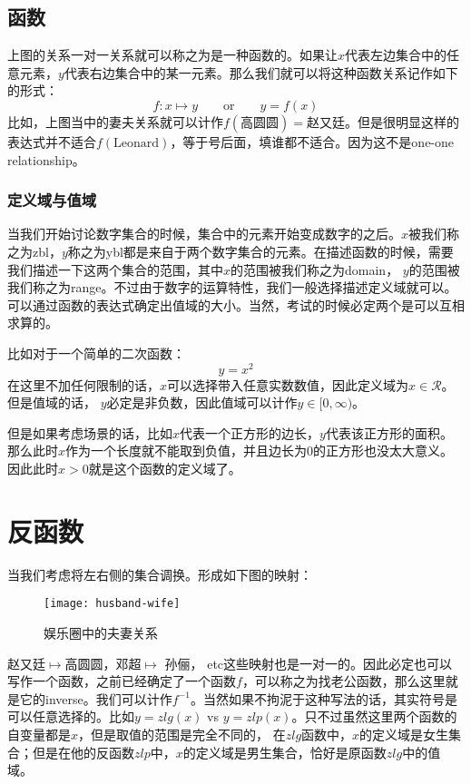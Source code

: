 \subsection*{函数}
\label{subsec:Function}
上图的关系一对一关系就可以称之为是一种函数的。如果让$x$代表左边集合中的任意元素，$y$代表右边集合中的某一元素。那么我们就可以将这种函数关系记作如下的形式：
\[
	f: x\mapsto y  \qquad \text{or} \qquad  y=f(x)
\]
比如，上图当中的妻夫关系就可以计作$f(\text{高圆圆})=\text{赵又廷}$。但是很明显这样的表达式并不适合$f(\text{Leonard})$，等于号后面，填谁都不适合。因为这不是one-one relationship。

\subsubsection*{定义域与值域}
\label{Domain and Range}
当我们开始讨论数字集合的时候，集合中的元素开始变成数字的之后。$x$被我们称之为\gls{zbl}，$y$称之为\gls{ybl}都是来自于两个数字集合的元素。在描述函数的时候，需要我们描述一下这两个集合的范围，其中$x$的范围被我们称之为\gls{domain}， $y$的范围被我们称之为\gls{range}。不过由于数字的运算特性，我们一般选择描述定义域就可以。可以通过函数的表达式确定出值域的大小。当然，考试的时候必定两个是可以互相求算的。

比如对于一个简单的二次函数：
\[
	y = x^2
\]
在这里不加任何限制的话，$x$可以选择带入任意实数数值，因此定义域为$x\in \mathcal{R}$。但是值域的话， $y$必定是非负数，因此值域可以计作$y\in [0,\infty)$。

但是如果考虑场景的话，比如$x$代表一个正方形的边长，$y$代表该正方形的面积。那么此时$x$作为一个长度就不能取到负值，并且边长为$0$的正方形也没太大意义。因此此时$x>0$就是这个函数的定义域了。
\clearpage


\section{反函数}
\label{sec:Inverse Function}
当我们考虑将左右侧的集合调换。形成如下图的映射：
\begin{figure}[H]
\centering
\texttt{[image: husband-wife]}
\caption{娱乐圈中的夫妻关系}
\end{figure}


赵又廷$\mapsto$高圆圆，邓超$\mapsto$ 孙俪， etc这些映射也是一对一的。因此必定也可以写作一个函数，之前已经确定了一个函数$f$，可以称之为找老公函数，那么这里就是它的\gls{inverse}。我们可以计作$f^{-1}$。当然如果不拘泥于这种写法的话，其实符号是可以任意选择的。比如$y=zlg(x)$ vs $y=zlp(x)$。只不过虽然这里两个函数的自变量都是$x$，但是取值的范围是完全不同的， 在$zlg$函数中，$x$的定义域是女生集合；但是在他的反函数$zlp$中，$x$的定义域是男生集合，恰好是原函数$zlg$中的值域。

